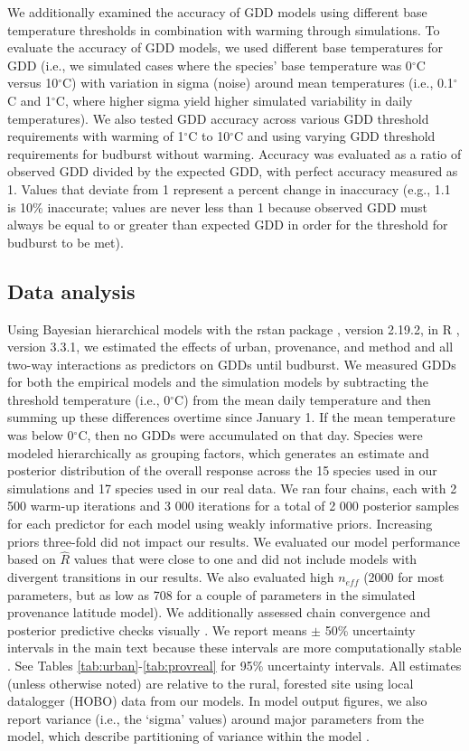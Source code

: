 \documentclass{article}\usepackage[]{graphicx}\usepackage[]{color}
\begin{document}
We additionally examined the accuracy of GDD models using different base temperature thresholds in combination with warming through simulations. To evaluate the accuracy of GDD models, we used different base temperatures for GDD (i.e., we simulated cases where the species' base temperature was 0$^{\circ}$C versus 10$^{\circ}$C) with variation in sigma (noise) around mean temperatures (i.e., 0.1$^{\circ}$C and 1$^{\circ}$C, where higher sigma yield higher simulated variability in daily temperatures). We also tested GDD accuracy across various GDD threshold requirements with warming of 1$^{\circ}$C to 10$^{\circ}$C and using varying GDD threshold requirements for budburst without warming. Accuracy was evaluated as a ratio of observed GDD divided by the expected GDD, with perfect accuracy measured as 1. Values that deviate from 1 represent a percent change in inaccuracy (e.g., 1.1 is 10\% inaccurate; values are never less than 1 because observed GDD must always be equal to or greater than expected GDD in order for the threshold for budburst to be met).

\subsection*{Data analysis}
Using Bayesian hierarchical models with the rstan package \citep{rstan2019}, version 2.19.2,  in R \citep{R}, version 3.3.1, we estimated the effects of urban, provenance, and method and all two-way interactions as predictors on GDDs until budburst. We measured GDDs for both the empirical models and the simulation models by subtracting the threshold temperature (i.e., 0$^{\circ}$C) from the mean daily temperature and then summing up these differences overtime \citep{Asse2018} since January 1. If the mean temperature was below 0$^{\circ}$C, then no GDDs were accumulated on that day. Species were modeled hierarchically as grouping factors, which generates an estimate and posterior distribution of the overall response across the 15 species used in our simulations and 17 species used in our real data. We ran four chains, each with 2 500 warm-up iterations and 3 000 iterations for a total of 2 000 posterior samples for each predictor for each model using weakly informative priors. Increasing priors three-fold did not impact our results. We evaluated our model performance based on $\hat{R}$ values that were close to one and did not include models with divergent transitions in our results. We also evaluated high $n_{eff}$ (2000 for most parameters, but as low as 708 for a couple of parameters in the simulated provenance latitude model). We additionally assessed chain convergence and posterior predictive checks visually \citep{BDA}. We report means $\pm$ 50\% uncertainty intervals in the main text because these intervals are more computationally stable \citep{BDA,Carpenter2017}. See Tables \ref{tab:urban}-\ref{tab:provreal} for 95\% uncertainty intervals. All estimates (unless otherwise noted) are relative to the rural, forested site using local datalogger (HOBO) data from our models. In model output figures, we also report variance (i.e., the `sigma' values) around major parameters from the model, which describe partitioning of variance within the model \citep{BDA}. 
\end{document}
